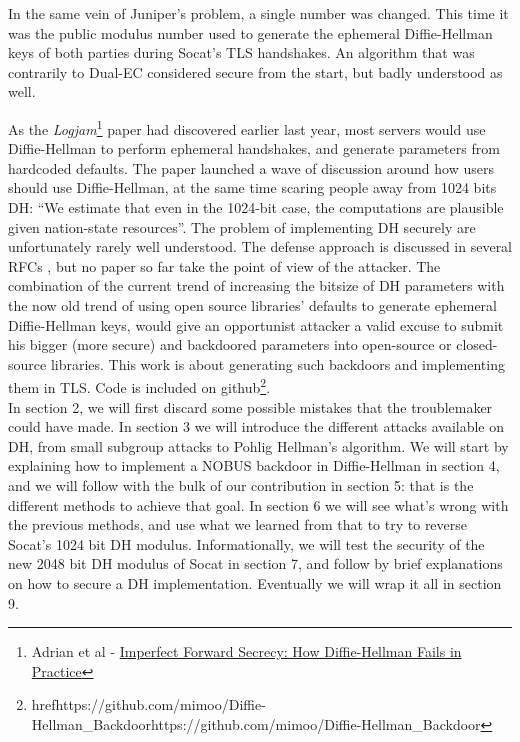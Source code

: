 \documentclass[a4paper,11pt,twocolumn]{article}
\begin{document}
In the same vein of Juniper's problem, a single number was changed. This time it was the public modulus number used to generate the ephemeral Diffie-Hellman keys of both parties during Socat's TLS handshakes. An algorithm that was contrarily to Dual-EC considered secure from the start, but badly understood as well.

As the \emph{Logjam}\footnote{Adrian et al - \href{https://weakdh.org/imperfect-forward-secrecy-ccs15.pdf}{Imperfect Forward Secrecy: How Diffie-Hellman Fails in Practice}}\cite{logjam} paper had discovered earlier last year, most servers would use Diffie-Hellman to perform ephemeral handshakes, and generate parameters from hardcoded defaults. The paper launched a wave of discussion around how users should use Diffie-Hellman, at the same time scaring people away from 1024 bits DH: ``We estimate that even in the 1024-bit case, the computations are plausible given nation-state resources''. The problem of implementing DH securely are unfortunately rarely well understood. The defense approach is discussed in several RFCs \cite{rfc2631} \cite{rfc2785}, but no paper so far take the point of view of the attacker. The combination of the current trend of increasing the bitsize of DH parameters with the now old trend of using open source libraries' defaults to generate ephemeral Diffie-Hellman keys, would give an opportunist attacker a valid excuse to submit his bigger (more secure) and backdoored parameters into open-source or closed-source libraries. This work is about generating such backdoors and implementing them in TLS. Code is included on github\footnote{href{https://github.com/mimoo/Diffie-Hellman_Backdoor}{https://github.com/mimoo/Diffie-Hellman_Backdoor}}.\\

In section 2, we will first discard some possible mistakes that the troublemaker could have made. In section 3 we will introduce the different attacks available on DH, from small subgroup attacks to Pohlig Hellman's algorithm. We will start by explaining how to implement a NOBUS backdoor in Diffie-Hellman in section 4, and we will follow with the bulk of our contribution in section 5: that is the different methods to achieve that goal. In section 6 we will see what's wrong with the previous methods, and use what we learned from that to try to reverse Socat's 1024 bit DH modulus. Informationally, we will test the security of the new 2048 bit DH modulus of Socat in section 7, and follow by brief explanations on how to secure a DH implementation. Eventually we will wrap it all in section 9.
\end{document}
